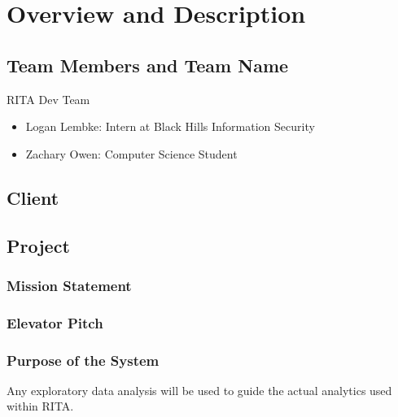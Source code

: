 

\chapter{Overview and  Description }

\section{Team Members and Team Name}
RITA Dev Team
\begin{itemize}
\item Logan Lembke: Intern at Black Hills Information Security
\item Zachary Owen: Computer Science Student
\end{itemize}

\section{Client}

\section{Project}

\subsection{Mission Statement}
\subsection{Elevator Pitch}

\subsection{Purpose of the System}
Any exploratory data analysis will be used to guide the actual analytics used within RITA.

